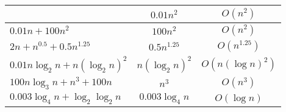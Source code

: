 \documentclass[]{article}
\begin{document}
\begin{enumerate}
\begin{tabular}{|l|c|c|}
\begin{minipage}{50mm}
\end{minipage}
& $0.01n^{2}$ & $O(n^{2})$\\ \hline
\begin{minipage}{50mm} \vspace*{2mm}
$0.01n + 100n^{2}$ \vspace*{2mm}
\end{minipage}
& $100n^{2}$ &  $O(n^{2})$\\ \hline
\begin{minipage}{50mm} \vspace*{2mm}
$2n +  n^{0.5} + 0.5n^{1.25}$ \vspace*{2mm}
\end{minipage}
& $0.5n^{1.25}$ & $O(n^{1.25})$\\ \hline
\begin{minipage}{50mm} \vspace*{2mm}
$0.01n \log_{2}n + n(\log_{2} n )^{2}$ \vspace*{2mm}
\end{minipage}
& $n(\log_{2} n )^{2}$ & $O(n(\log n )^{2})$ \\ \hline
\begin{minipage}{50mm} \vspace*{2mm}
$100n \log_{3} n + n^{3} + 100n$ \vspace*{2mm}
\end{minipage}
& $n^{3}$ & $O(n^{3})$ \\ \hline
\begin{minipage}{50mm} \vspace*{2mm}
$0.003\log_{4}n + \log_{2} \log_{2} n$ \vspace*{2mm}
\end{minipage}
& $0.003\log_{4}n$ & $O(\log n)$\\ \hline
\end{tabular}
   

\end{enumerate}
\end{document}

